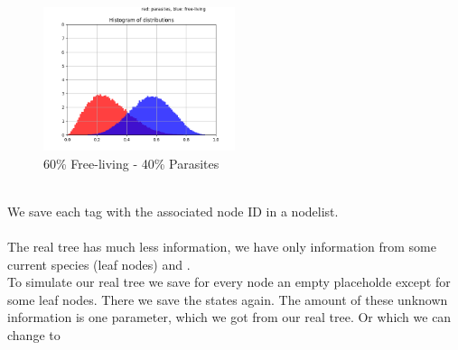       \begin{figure}
        \caption{60\% Free-living - 40\% Parasites}
        \centering
          \includegraphics[width=0.5\textwidth]{Figures/40-60.png}
      \end{figure}
       \\
      We save each tag with the associated node ID in a nodelist. \\
       \\
      The real tree has much less information, we have only information from some current species 
        (leaf nodes) and . \\
      To simulate our real tree we save for every node an empty placeholde except for some leaf nodes.
      There we save the states again. The amount of these unknown information is one parameter, which we
      got from our real tree. Or which we can change to 

